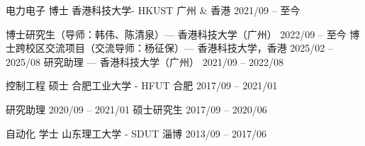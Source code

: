 

\begin{cventries}



  \cventry
    {电力电子 博士} %
    {香港科技大学- HKUST} %
    {广州 \& 香港} %
    {2021/09 – 至今} %
    {\vspace{-1em}
      \begin{cvsubentries}
        \cvsubentry
          {}
          {博士研究生（导师：韩伟、陈清泉）\textnormal{— 香港科技大学（广州）}}
          {2022/09 – 至今}
          {}
        \cvsubentry
          {}
          {博士跨校区交流项目（交流导师：杨征保）\textnormal{— 香港科技大学，香港}}
          {2025/02 – 2025/08}
          {}
        \cvsubentry
          {}
          {研究助理 \textnormal{— 香港科技大学（广州）}}
          {2021/09 – 2022/08}
          {}
      \end{cvsubentries}
      \vspace{-1em}
    }



  \cventry
    {控制工程 硕士} %
    {合肥工业大学 - HFUT} %
    {合肥} %
    {2017/09 – 2021/01} %
    {\vspace{-1em}
      \begin{cvsubentries}
        \cvsubentry
          {}
          {研究助理}
          {2020/09 – 2021/01}
          {}
        \cvsubentry
          {}
          {硕士研究生}
          {2017/09 – 2020/06}
          {}
      \end{cvsubentries}
      \vspace{-1em}
    }

  \cventry
    {自动化 学士} %
    {山东理工大学 - SDUT} %
    {淄博} %
    {2013/09 – 2017/06} %
    {
    }

\end{cventries}
